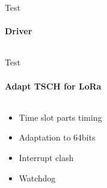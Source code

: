 \begin{frame}{Test}
\framesubtitle{Driver}

\begin{columns}
\begin{column}{0.5\textwidth}

\end{column}
\begin{column}{0.5\textwidth}

\end{column}
\end{columns}

\end{frame}

\begin{frame}{Test}
\framesubtitle{Adapt TSCH for LoRa}

\begin{columns}
\begin{column}{0.5\textwidth}
\begin{itemize}
    \item Time slot parts timing 
    \item Adaptation to 64bits
    \item Interrupt clash
    \item Watchdog
\end{itemize}
\end{column}
\begin{column}{0.5\textwidth}

\end{column}
\end{columns}

\end{frame}
